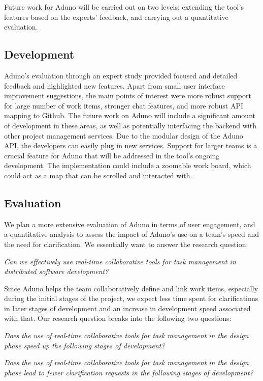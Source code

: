 \documentclass[conference]{IEEEtran}
\begin{document}
Future work for Aduno will be carried out on two levels: extending the tool's features based on the experts' feedback, and carrying out a quantitative evaluation. 
\subsection{Development}
Aduno's evaluation through an expert study provided focused and detailed feedback and highlighted new features.  Apart from small user interface improvement suggestions, the main points of interest were more robust support for large number of work items, stronger chat features, and more robust API mapping to Github. The future work on Aduno will include a significant amount of development in these areas, as well as potentially interfacing the backend with other project management services. Due to the modular design of the Aduno API, the developers can easily plug in new services.  Support for larger teams is a crucial feature for Aduno that will be addressed in the tool's ongoing development.  The implementation could include a zoomable work board, which could act as a map that can be scrolled and interacted with.  

\subsection{Evaluation}
We plan a more extensive evaluation of Aduno in terms of user engagement, and a quantitative analysis to assess the impact of Aduno's use on a team's speed and the need for clarification. We essentially want to answer the research question:

\textit{Can we effectively use real-time collaborative tools for task management in distributed software development?} 

Since Aduno helps the team collaboratively define and link work items, especially during the initial stages of the project, we expect less time spent for clarifications in later stages of development and an increase in development speed associated with that. Our research question breaks into the following two questions:

\textit{Does the use of real-time collaborative tools for task management in the design phase speed up the following stages of development?}

\textit{Does the use of real-time collaborative tools for task management in the design phase lead to fewer clarification requests in the following stages of development?}
\end{document}
